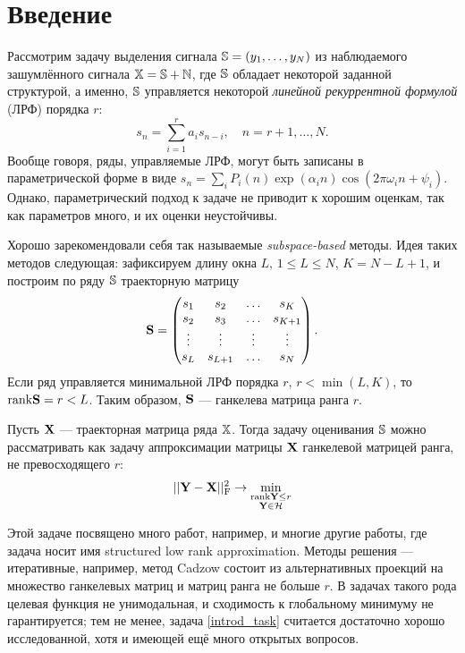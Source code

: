 \documentclass[12pt,a4paper,fleqn,leqno]{article}
\begin{document}
\section{Введение}
Рассмотрим задачу выделения сигнала $\mathbb{S} = (y_1, \ldots, y_N)$ из наблюдаемого зашумлённого сигнала $\mathbb{X} = \mathbb{S} + \mathbb{N}$, где $\mathbb{S}$  обладает некоторой заданной структурой, а именно, $\mathbb{S}$ управляется некоторой \emph{линейной рекуррентной формулой} (ЛРФ) порядка $r$:
\begin{equation*}
s_n = \sum_{i = 1}^{r} a_i s_{n-i}, \quad n = r + 1, \ldots, N.
\end{equation*}
Вообще говоря, ряды, управляемые ЛРФ, могут быть записаны в параметрической форме в виде $s_n = \sum_i P_i(n) \exp(\alpha_i n) \cos(2 \pi \omega_i n + \psi_i)$. Однако, параметрический подход к задаче не приводит к хорошим оценкам, так как параметров много, и их оценки неустойчивы.

Хорошо зарекомендовали себя так называемые \emph{subspace-based} методы. Идея таких методов следующая: зафиксируем длину окна $L$, $1 \le L \le N$, $K = N - L + 1$, и построим по ряду $\mathbb{S}$ траекторную матрицу
\begin{equation*}
\mathbf{S} = \begin{pmatrix}
s_1 & s_2 & \ldots & s_K \\
s_2 & s_3 & \ldots & s_{K + 1} \\
\vdots & \vdots & \vdots & \vdots \\
s_L & s_{L + 1} & \ldots & s_N
\end{pmatrix}.
\end{equation*}
Если ряд управляется минимальной ЛРФ порядка $r$, $r < \min(L, K)$, то $\text{rank} \mathbf{S} = r < L$. Таким образом, $\mathbf{S}$ --- ганкелева матрица ранга $r$.

Пусть $\mathbf{X}$ --- траекторная матрица ряда $\mathbb{X}$. Тогда задачу оценивания $\mathbb{S}$ можно рассматривать как задачу аппроксимации матрицы $\mathbf{X}$ ганкелевой матрицей ранга, не превосходящего $r$:
\begin{equation}\label{introd_task}
||\mathbf{Y} - \mathbf{X}||^2_{\mathrm{F}} \to \min_{\substack{\text{rank} \mathbf{Y} \le r \\ \mathbf{Y} \in \mathcal{H}}}
\end{equation}

Этой задаче посвящено много работ, например, \cite{Cadzow1988, Markovsky2011, Usevich.Markovsky2014, Gillard2014} и многие другие работы, где задача носит имя 
structured low rank approximation. Методы решения --- итеративные, например, метод Cadzow состоит из альтернативных проекций на множество ганкелевых матриц и матриц ранга не больше $r$. В задачах такого рода целевая функция не унимодальная, и сходимость к глобальному минимуму не гарантируется; тем не менее, задача \eqref{introd_task} считается достаточно хорошо исследованной, хотя и имеющей ещё много открытых вопросов.
\end{document}
